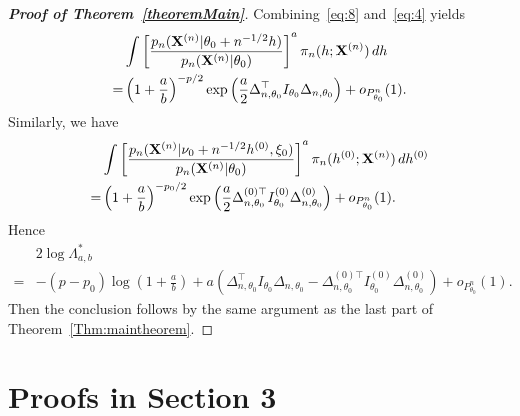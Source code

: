 \documentclass[11pt]{article}
\theoremstyle{plain}
\theoremstyle{definition}
\theoremstyle{remark}
\begin{document}
\begin{appendices}
\begin{proof}[\textbf{Proof of Theorem~\ref{theoremMain}}]
Combining~\eqref{eq:8} and~\eqref{eq:4} yields
\begin{equation*}
    \begin{split}
    &\int \left[ \frac{p_n(\mathbf{X}^{(n)}|\theta_0+n^{-1/2}h)}{p_n(\mathbf{X}^{(n)}|\theta_0)}\right]^a \pi_n (h;\mathbf{X}^{(n)}) \, dh
    \\
    =&\left(1+\frac{a}{b}\right)^{-p/2} \exp\left(\frac{a}{2}\Delta_{n,\theta_0}^\top  I_{\theta_0}\Delta_{n,\theta_0}\right)+o_{P_{\theta_0}^n}(1).
    \end{split}
\end{equation*}
Similarly, we have
\begin{equation*}
    \begin{split}
    &\int \left[ \frac{p_n(\mathbf{X}^{(n)}|\nu_0+n^{-1/2}h^{(0)},\xi_0)}{p_n(\mathbf{X}^{(n)}|\theta_0)}\right]^a \pi_n (h^{(0)};\mathbf{X}^{(n)}) \, dh^{(0)}
    \\
    =&\left(1+\frac{a}{b}\right)^{-p_0/2} \exp\left(\frac{a}{2}\Delta_{n,\theta_0}^{(0)\top} I^{(0)}_{\theta_0}\Delta^{(0)}_{n,\theta_0}\right)+o_{P_{\theta_0}^n}(1).
    \end{split}
\end{equation*}
Hence
\begin{equation*}
    \begin{aligned} 
        &2\log \Lambda_{a,b}^*\\
        =&
        -{(p-p_0)}\log (1+\frac{a}{b})+{a}\left(
\Delta_{n,\theta_0}^\top  I_{\theta_0}\Delta_{n,\theta_0}
        -\Delta_{n,\theta_0}^{(0)\top} I^{(0)}_{\theta_0}\Delta^{(0)}_{n,\theta_0}\right)
        +o_{P^n_{\theta_0}}(1).
    \end{aligned}
\end{equation*}
Then the conclusion follows by the same argument as the last part of Theorem~\ref{Thm:maintheorem}.
\end{proof}

\section{Proofs in Section 3}


\end{appendices}
\end{document}
